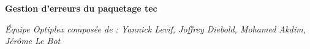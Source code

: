 \documentclass[11pt,a4paper]{article}
\begin{document}
\begin{center}
\huge{\textbf{Gestion d’erreurs du paquetage tec}}
\end{center}

\begin{flushleft}
\emph{\'Equipe \og Optiplex \fg composée de : Yannick Levif, Joffrey Diebold, Mohamed Akdim, Jérôme Le Bot}
\end{flushleft}



\end{document}
